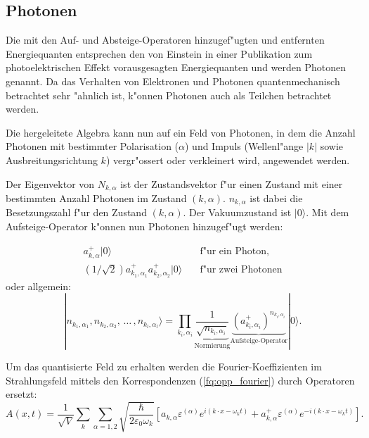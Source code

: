\begin{refsection}
\subsection{Photonen}

Die mit den Auf- und Absteige-Operatoren hinzugef"ugten und entfernten Energiequanten entsprechen den von Einstein in einer Publikation zum photoelektrischen Effekt vorausgesagten Energiequanten und werden Photonen genannt. Da das Verhalten von Elektronen und Photonen quantenmechanisch betrachtet sehr "ahnlich ist, k"onnen Photonen auch als Teilchen betrachtet werden.

Die hergeleitete Algebra kann nun auf ein Feld von Photonen, in dem die Anzahl Photonen mit bestimmter Polarisation ($\alpha$) und Impuls (Wellenl"ange $|k|$ sowie Ausbreitungsrichtung $k$) vergr"ossert oder verkleinert wird, angewendet werden.

Der Eigenvektor von $N_{k,\alpha}$ ist der Zustandsvektor f"ur einen Zustand mit einer bestimmten Anzahl Photonen im Zustand $(k,\alpha)$. $n_{k,\alpha}$ ist dabei die Besetzungszahl f"ur den Zustand $(k,\alpha)$. Der Vakuumzustand ist $|0\rangle$. Mit dem Aufsteige-Operator k"onnen nun Photonen hinzugef"ugt werden:

\begin{align*}
a^+_{k,\alpha}|0\rangle & \quad \text{f"ur ein Photon,}\\
\left(1/\sqrt{2}\right)a^+_{k_1,\alpha_1}a^+_{k_2,\alpha_2}|0\rangle & \quad \text{f"ur zwei Photonen}
\end{align*}
oder allgemein:
\begin{equation*}
|n_{k_1,\alpha_1}, n_{k_2,\alpha_2}, \, \hdots \, , n_{k_l,\alpha_l}\rangle =
 \prod_{k_i,\alpha_i}\underbrace{\frac{1}{\sqrt{n_{k_i,\alpha_i}}}}_{\text{Normierung}} \underbrace{\left(a^+_{k_i,\alpha_i}\right)^{n_{k_i,\alpha_i}}}_{\text{Aufsteige-Operator}} |0\rangle.
\end{equation*}

Um das quantisierte Feld zu erhalten werden die Fourier-Koeffizienten im Strahlungsfeld mittels den Korrespondenzen (\ref{fq:opp_fourier}) durch Operatoren ersetzt:
\begin{equation*}
A(x,t) = \frac{1}{\sqrt{V}} \sum_k \sum_{\alpha=1,2} \sqrt{\frac{\hbar}{2 \varepsilon_0 \omega_k}} \left[a_{k,\alpha} \varepsilon^{(\alpha)} e^{i (k \cdot x - \omega_k t)} + a^+_{k,\alpha} \varepsilon^{(\alpha)} e^{-i (k \cdot x - \omega_k t)}\right].
\end{equation*}


\end{refsection}
